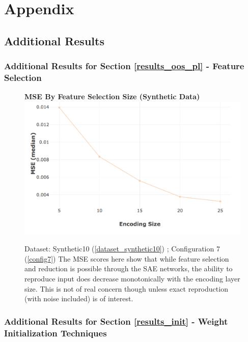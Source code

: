 \documentclass[a4paper,11pt,oneside]{article}
\theoremstyle{plain}
\theoremstyle{definition}
\begin{document}
	\newpage
	\section{Appendix}\label{Appendix}
	
	\subsection{Additional Results}
	
	\subsubsection{Additional Results for Section \ref{results_oos_pl} - Feature Selection }\label{results_features_appendix}
	
	\begin{figure}[H]
		\centering 
		\textbf{MSE By Feature Selection Size (Synthetic Data)}
		\includegraphics[scale=0.3]{images/results/8_appendix/synth_sae_mse.png} 
		\caption[MSE By Feature Selection Size (Synthetic Data)]{Dataset: Synthetic10 (\ref{dataset_synthetic10}) ; Configuration 7 (\ref{config7})
			\newline The MSE scores here show that while feature selection and reduction is possible through the SAE networks, the ability to reproduce input does decrease monotonically with the encoding layer size. This is not of real concern though unless exact reproduction (with noise included) is of interest.}
		\label{figure-synth_sae_mse}
	\end{figure}
	
	\subsubsection{Additional Results for Section \ref{results_init} - Weight Initialization Techniques }\label{results_init_appendix}
	
\end{document}
